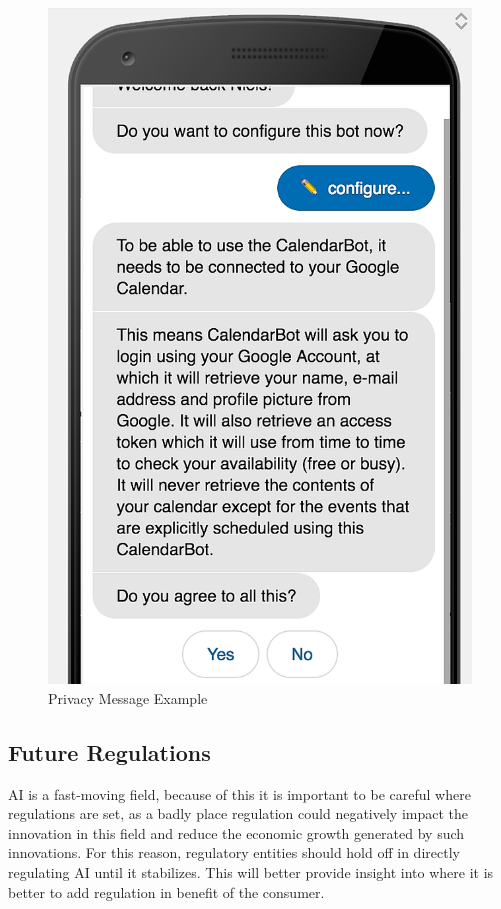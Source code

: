 \begin{center}
	\begin{figure}[h!]
		\centering
		\includegraphics[scale=0.2]{./images/2-priv-first}
		\caption{Privacy Message Example\cite{five-gdpr}}
		\label{priv-msg}
	\end{figure}
\end{center}





\subsection{Future Regulations}\label{sec:chap2_fut_ref}
AI is a fast-moving field, because of this it is important to be careful where regulations are set, as a badly place regulation could negatively impact the innovation in this field and reduce the economic growth generated by such innovations. For this reason, regulatory entities should hold off in directly regulating AI until it stabilizes. This will better provide insight into where it is better to add regulation in benefit of the consumer.\\

